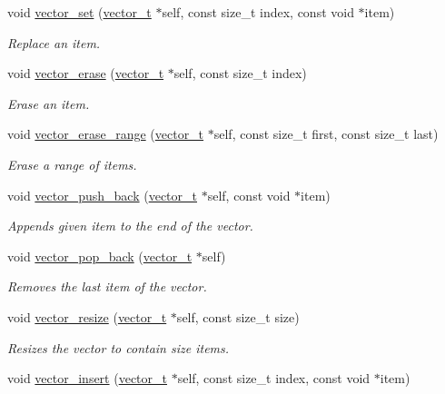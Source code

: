 \begin{DoxyCompactItemize}
void \hyperlink{group__vector_ga50c566682c6ec48ef8f7f4224c112d03}{vector\-\_\-set} (\hyperlink{structvector__t}{vector\-\_\-t} $\ast$self, const size\-\_\-t index, const void $\ast$item)
\begin{DoxyCompactList}\small\item\em \-Replace an item. \end{DoxyCompactList}\item 
void \hyperlink{group__vector_ga99460cea333533ca48e5cb23c37642f0}{vector\-\_\-erase} (\hyperlink{structvector__t}{vector\-\_\-t} $\ast$self, const size\-\_\-t index)
\begin{DoxyCompactList}\small\item\em \-Erase an item. \end{DoxyCompactList}\item 
void \hyperlink{group__vector_ga089b70be0dbd06c497470359e725b4ef}{vector\-\_\-erase\-\_\-range} (\hyperlink{structvector__t}{vector\-\_\-t} $\ast$self, const size\-\_\-t first, const size\-\_\-t last)
\begin{DoxyCompactList}\small\item\em \-Erase a range of items. \end{DoxyCompactList}\item 
void \hyperlink{group__vector_ga0934c3049233d3688b7fa74e23536bbf}{vector\-\_\-push\-\_\-back} (\hyperlink{structvector__t}{vector\-\_\-t} $\ast$self, const void $\ast$item)
\begin{DoxyCompactList}\small\item\em \-Appends given item to the end of the vector. \end{DoxyCompactList}\item 
void \hyperlink{group__vector_ga03f7948a7302fda208afe31bf7f324eb}{vector\-\_\-pop\-\_\-back} (\hyperlink{structvector__t}{vector\-\_\-t} $\ast$self)
\begin{DoxyCompactList}\small\item\em \-Removes the last item of the vector. \end{DoxyCompactList}\item 
void \hyperlink{group__vector_gae88ff6d21d8f963ba97790086d18506a}{vector\-\_\-resize} (\hyperlink{structvector__t}{vector\-\_\-t} $\ast$self, const size\-\_\-t size)
\begin{DoxyCompactList}\small\item\em \-Resizes the vector to contain size items. \end{DoxyCompactList}\item 
void \hyperlink{group__vector_gaa69087a65fe41ccc9a6763053a0db7da}{vector\-\_\-insert} (\hyperlink{structvector__t}{vector\-\_\-t} $\ast$self, const size\-\_\-t index, const void $\ast$item)

\end{DoxyCompactItemize}

